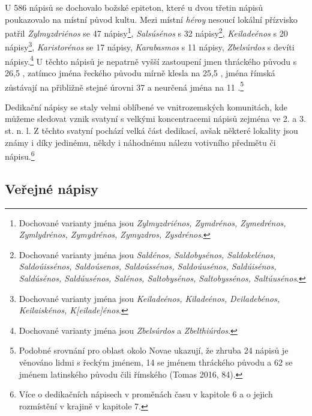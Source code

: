U 586 nápisů se dochovalo božské epiteton, které u dvou třetin nápisů poukazovalo na místní původ kultu. Mezi místní {\em héroy} nesoucí lokální přízvisko patřil {\em Zylmyzdriénos} se 47 nápisy\footnote{Dochované varianty jména jsou {\em Zylmyzdriénos, Zymdrénos, Zymedrénos, Zymlydrénos, Zymydrénos, Zymyzdros, Zysdrénos}.}, {\em Salsúsénos} s 32 nápisy\footnote{Dochované varianty jména jsou {\em Saldénos, Saldobysénos, Saldokelénos, Saldoúissénos, Saldoúsenos, Saldoússénos, Saldoúusénos, Saldúisénos, Saldúsénos, Saldúusénos, Salénos, Saltobysénos, Saltobyssénos, Saltúusénos}.}, {\em Keiladeénos} s 20 nápisy\footnote{Dochované varianty jména jsou {\em Keiladeénos, Kiladeénos, Deiladebénos, Keilaiskénos, K{[}eilade{]}énos}.}, {\em Karistorénos} se 17 nápisy, {\em Karabasmos} s 11 nápisy, {\em Zbelsúrdos} s devíti nápisy.\footnote{Dochované varianty jména jsou {\em Zbelsúrdos} a {\em Zbelthiúrdos}.} U těchto nápisů je nepatrně vyšší zastoupení jmen thráckého původu s 26,5 , zatímco jména řeckého původu mírně klesla na 25,5 , jména římská zůstávají na přibližně stejné úrovni 37  a neurčená jména na 11 .\footnote{Podobné srovnání pro oblast okolo Novae ukazují, že zhruba 24  nápisů je věnováno lidmi s řeckým jménem, 14  se jménem thráckého původu a 62  se jménem latinského původu čili římského (Tomas 2016, 84).}

Dedikační nápisy se staly velmi oblíbené ve vnitrozemských komunitách, kde můžeme sledovat vznik svatyní s velkými koncentracemi nápisů zejména ve 2. a 3. st. n. l. Z těchto svatyní pochází velká část dedikací, avšak některé lokality jsou známy i díky jedinému, někdy i náhodnému nálezu votivního předmětu či nápisu.\footnote{Více o dedikačních nápisech v proměnách času v kapitole 6 a o jejich rozmístění v krajině v kapitole 7.}

\subsection[veřejné-nápisy]{Veřejné nápisy}

